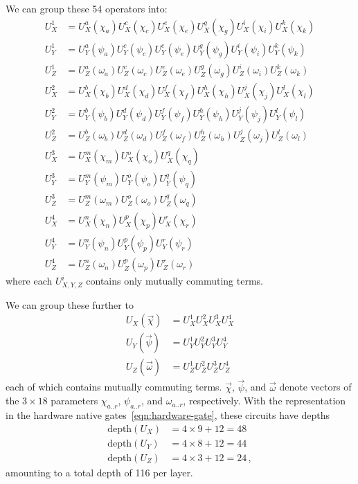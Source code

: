 \documentclass[a4paper,12pt]{article}
\begin{document}
We can group these 54 operators into:
\begin{equation}\label{eqn:ux1groups}\begin{aligned}
U_X^1 &= U_X^a(\chi_a) U_X^c(\chi_c) U_X^e(\chi_e) U_X^g(\chi_g) U_X^i(\chi_i) U_X^k(\chi_k) \\
U_Y^1 &= U_Y^a(\psi_a) U_Y^c(\psi_c) U_Y^e(\psi_e) U_Y^g(\psi_g) U_Y^i(\psi_i) U_Y^k(\psi_k) \\
U_Z^1 &= U_Z^a(\omega_a) U_Z^c(\omega_c) U_Z^e(\omega_e) U_Z^g(\omega_g) U_Z^i(\omega_i) U_Z^k(\omega_k) \\
%
U_X^2 &= U_X^b(\chi_b) U_X^d(\chi_d) U_X^f(\chi_f) U_X^h(\chi_h) U_X^j(\chi_j) U_X^l(\chi_l) \\
U_Y^2 &= U_Y^b(\psi_b) U_Y^d(\psi_d) U_Y^f(\psi_f) U_Y^h(\psi_h) U_Y^j(\psi_j) U_Y^l(\psi_l) \\
U_Z^2 &= U_Z^b(\omega_b) U_Z^d(\omega_d) U_Z^f(\omega_f) U_Z^h(\omega_h) U_Z^j(\omega_j) U_Z^l(\omega_l) \\
%
U_X^3 &= U_X^m(\chi_m) U_X^o(\chi_o) U_X^q(\chi_q) \\
U_Y^3 &= U_Y^m(\psi_m) U_Y^o(\psi_o) U_Y^q(\psi_q) \\
U_Z^3 &= U_Z^m(\omega_m) U_Z^o(\omega_o) U_Z^q(\omega_q) \\
%
U_X^4 &= U_X^n(\chi_n) U_X^p(\chi_p) U_X^r(\chi_r) \\
U_Y^4 &= U_Y^n(\psi_n) U_Y^p(\psi_p) U_Y^r(\psi_r) \\
U_Z^4 &= U_Z^n(\omega_n) U_Z^p(\omega_p) U_Z^r(\omega_r) 
\end{aligned}\end{equation}
where each $U^i_{X,Y,Z}$ contains only mutually commuting terms.

We can group these further to
\begin{equation}\begin{aligned}
U_X(\vec\chi) &= U_X^1 U_X^2 U_X^3 U_X^4 \\
U_Y(\vec\psi) &= U_Y^1 U_Y^2 U_Y^3 U_Y^4 \\
U_Z(\vec\omega) &= U_Z^1 U_Z^2 U_Z^3 U_Z^4
\end{aligned}\end{equation}
each of which contains mutually commuting terms. $\vec\chi$, $\vec\psi$, and $\vec\omega$ denote vectors of the $3 \times 18$ parameters $\chi_{a..r}$, $\psi_{a..r}$, and $\omega_{a..r}$, respectively. With the representation in the hardware native gates~\eqref{eqn:hardware-gate}, these circuits have depths
\begin{equation}\begin{aligned}
\text{depth}(U_X) &= 4 \times 9 + 12 = 48 \\
\text{depth}(U_Y) &= 4 \times 8 + 12 = 44 \\
\text{depth}(U_Z) &= 4 \times 3 + 12 = 24 \,,
\end{aligned}\end{equation}
amounting to a total depth of 116 per layer.
\end{document}
